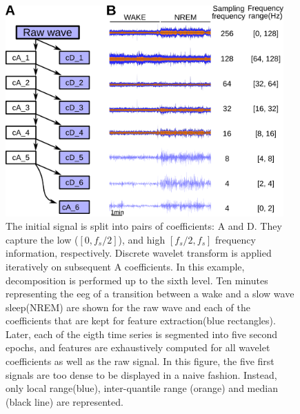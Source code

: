 
\begin{figure}[h!]

  \centering    
    \includegraphics[width=0.95\textwidth]{figures/dwd.pdf}
  \caption{
  The initial signal is split into pairs of coefficients: A and D. They capture the low ($[0, f_s/2]$), and high $[f_s/2, f_s]$ frequency information, respectively.
  Discrete wavelet transform is applied iteratively on subsequent A coefficients. In this example, decomposition is performed up to the sixth level.
  Ten minutes representing the \gls{eeg} of a transition between a wake and a slow wave sleep(NREM) are shown for the raw wave and each of the coefficients that are kept for feature extraction(blue rectangles). 
  Later, each of the eigth time series is segmented into five second epochs, and features are exhaustively computed for all wavelet coefficients as well as the raw signal.
  In this figure, the five first signals are too dense to be displayed in a naive fashion. Instead, only local range(blue), inter-quantile range (orange) and median (black line) are represented.
  \label{fig:dwd}
  }
           
\end{figure}

